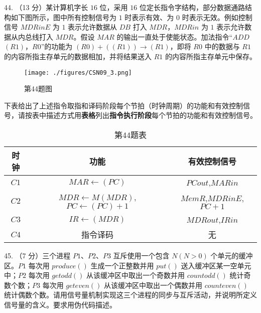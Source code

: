 44. （13 分）某计算机字长 $16$ 位，采用 $16$ 位定长指令字结构，部分数据通路结构如下图所示，图中所有控制信号为 $1$ 时表示有效、为 $0$ 时表示无效。例如控制信号 $MDRinE$ 为 $1$ 表示允许数据从 $DB$ 打入 $MDR$，$MDRin$ 为 $1$ 表示允许数据从内总线打入 $MDR$。假设 $MAR$ 的输出一直处于使能状态。加法指令“$ADD$ $(R1)$，$R0$”的功能为 $(R0)+((R1)) \rightarrow (R1)$，即将 $R0$ 中的数据与 $R1$ 的内容所指主存单元的数据相加，并将结果送入 $R1$ 的内容所指主存单元中保存。
\begin{figure}[ht]
\centering
\texttt{[image: ./figures/CSN09\_3.png]}
\caption{第44题图} \label{CSN09_fig3}
\end{figure}
下表给出了上述指令取指和译码阶段每个节拍（时钟周期）的功能和有效控制信号，请按表中描述方式用\textbf{表格}列出\textbf{指令执行阶段}每个节拍的功能和有效控制信号。
\begin{table}[ht]
\centering
\caption{第44题表}\label{CSN09_tab2}
\begin{tabular}{|c|c|c|}
\hline
时钟 & 功能 & 有效控制信号 \\
\hline
$C1$ & $MAR\leftarrow(PC)$ & $PCout$,$MARin$ \\
\hline
$C2$ & $MDR\leftarrow M(MDR)$,$PC\leftarrow(PC)+1$ & $MemR$,$MDRinE$,$PC+1$ \\
\hline
$C3$ & $IR\leftarrow(MDR)$ & $MDRout$,$IRin$ \\
\hline
$C4$ & 指令译码 & 无 \\
\hline
\end{tabular}
\end{table}

45. （7 分）三个进程 $P1$、$P2$、$P3$ 互斥使用一个包含 $N(N>0)$ 个单元的缓冲区。$P1$ 每次用 $produce()$ 生成一个正整数并用 $put()$ 送入缓冲区某一空单元中；$P2$ 每次用 $getodd()$ 从该缓冲区中取出一个奇数并用 $countodd()$ 统计奇数个数；$P3$ 每次用 $geteven()$ 从该缓冲区中取出一个偶数并用 $counteven()$ 统计偶数个数。请用信号量机制实现这三个进程的同步与互斥活动，并说明所定义信号量的含义。要求用伪代码描述。

